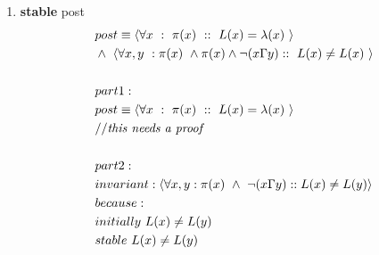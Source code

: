 \documentclass{article}
\begin{document}
\begin{enumerate}
\newpage
\item
\textbf{stable} post\\
\begin{align*}
&post \equiv \langle \forall x \ : \ \pi(x) \ :: \ L(x) = \lambda(x) \ \rangle\\
&\wedge \ \langle \forall x,y \ : \pi(x) \ \wedge \pi(x) \wedge \neg(x \Gamma y) :: \ L(x) \neq L(x)  \ \rangle\\
\\
&part 1:\\
&post \equiv \langle \forall x \ : \ \pi(x) \ :: \ L(x) = \lambda(x) \ \rangle\\
&//\emph{this needs a proof}\\
\\
&part 2:\\
&invariant: \langle \forall x,y : \pi(x) \ \wedge \ \neg(x\Gamma y) :: L(x)\neq L(y) \rangle\\
&because:\\
&initially \ L(x) \neq L(y)\\
&stable \ L(x) \neq L(y)\\
\end{align*}
\end{enumerate}
\end{document}
